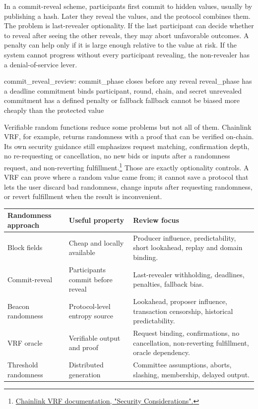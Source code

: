 In a commit-reveal scheme, participants first commit to hidden values, usually by publishing a hash. Later they reveal the values, and the protocol combines them. The problem is last-revealer optionality. If the last participant can decide whether to reveal after seeing the other reveals, they may abort unfavorable outcomes. A penalty can help only if it is large enough relative to the value at risk. If the system cannot progress without every participant revealing, the non-revealer has a denial-of-service lever.

\begin{codeblock}
commit_reveal_review:
    commit_phase closes before any reveal
    reveal_phase has a deadline
    commitment binds participant, round, chain, and secret
    unrevealed commitment has a defined penalty or fallback
    fallback cannot be biased more cheaply than the protected value
\end{codeblock}

Verifiable random functions reduce some problems but not all of them. Chainlink VRF, for example, returns randomness with a proof that can be verified on-chain. Its own security guidance still emphasizes request matching, confirmation depth, no re-requesting or cancellation, no new bids or inputs after a randomness request, and non-reverting fulfillment.\footnote{\href{https://docs.chain.link/vrf/v2-5/security}{Chainlink VRF documentation, "Security Considerations".}} Those are exactly optionality controls. A VRF can prove where a random value came from; it cannot save a protocol that lets the user discard bad randomness, change inputs after requesting randomness, or revert fulfillment when the result is inconvenient.

\begin{table}[htbp]
\centering
\small
\renewcommand{\arraystretch}{1.14}
\begin{tabularx}{\textwidth}{@{}>{\RaggedRight\arraybackslash}p{}>{\RaggedRight\arraybackslash}p{}X@{}}
\toprule
Randomness approach & Useful property & Review focus \\
\midrule
Block fields & Cheap and locally available & Producer influence, predictability, short lookahead, replay and domain binding. \\
Commit-reveal & Participants commit before reveal & Last-revealer withholding, deadlines, penalties, fallback bias. \\
Beacon randomness & Protocol-level entropy source & Lookahead, proposer influence, transaction censorship, historical predictability. \\
VRF oracle & Verifiable output and proof & Request binding, confirmations, no cancellation, non-reverting fulfillment, oracle dependency. \\
Threshold randomness & Distributed generation & Committee assumptions, aborts, slashing, membership, delayed output. \\
\bottomrule
\end{tabularx}
\end{table}

